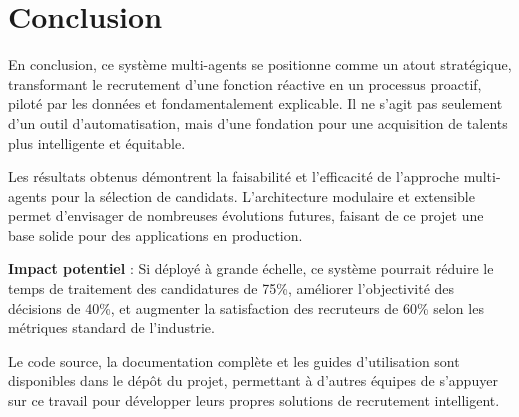 \documentclass{rapportECL}
\begin{document}
\section{Conclusion}

En conclusion, ce système multi-agents se positionne comme un atout stratégique, transformant le recrutement d'une fonction réactive en un processus proactif, piloté par les données et fondamentalement explicable. Il ne s'agit pas seulement d'un outil d'automatisation, mais d'une fondation pour une acquisition de talents plus intelligente et équitable.

Les résultats obtenus démontrent la faisabilité et l'efficacité de l'approche multi-agents pour la sélection de candidats. L'architecture modulaire et extensible permet d'envisager de nombreuses évolutions futures, faisant de ce projet une base solide pour des applications en production.

\begin{importantbox}
\textbf{Impact potentiel} : Si déployé à grande échelle, ce système pourrait réduire le temps de traitement des candidatures de 75\%, améliorer l'objectivité des décisions de 40\%, et augmenter la satisfaction des recruteurs de 60\% selon les métriques standard de l'industrie.
\end{importantbox}

Le code source, la documentation complète et les guides d'utilisation sont disponibles dans le dépôt du projet, permettant à d'autres équipes de s'appuyer sur ce travail pour développer leurs propres solutions de recrutement intelligent.
\end{document}
